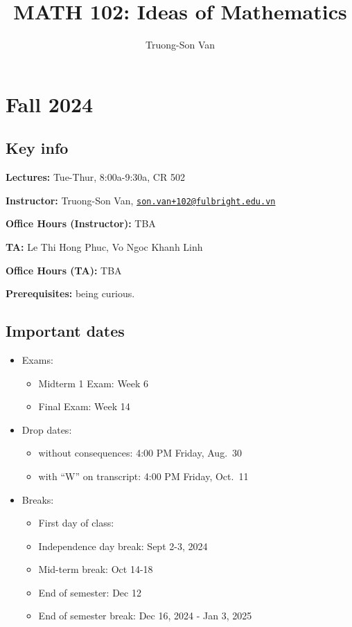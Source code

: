 \documentclass[
]{article}
\title{MATH 102: Ideas of Mathematics}
\author{Truong-Son Van}
\date{}
\providecommand{\tightlist}{%
  \setlength{\itemsep}{0pt}\setlength{\parskip}{0pt}}
\begin{document}
\maketitle

{
\setcounter{tocdepth}{2}
\tableofcontents
}
\section*{Fall 2024}\label{fall-2024}

\subsection*{Key info}\label{key-info}

\textbf{Lectures:} Tue-Thur, 8:00a-9:30a, CR 502

\textbf{Instructor:} Truong-Son Van, \href{mailto:son.van+102@fulbright.edu.vn}{\nolinkurl{son.van+102@fulbright.edu.vn}}

\textbf{Office Hours (Instructor):} TBA

\textbf{TA:} Le Thi Hong Phuc, Vo Ngoc Khanh Linh

\textbf{Office Hours (TA):}
TBA

\textbf{Prerequisites:} being curious.

\subsection*{Important dates}\label{important-dates}

\begin{itemize}
\tightlist
\item
  Exams:

  \begin{itemize}
  \tightlist
  \item
    Midterm 1 Exam: Week 6
  \item
    Final Exam: Week 14
  \end{itemize}
\item
  Drop dates:

  \begin{itemize}
  \tightlist
  \item
    without consequences: 4:00 PM Friday, Aug.~30
  \item
    with ``W'' on transcript: 4:00 PM Friday, Oct.~11
  \end{itemize}
\item
  Breaks:

  \begin{itemize}
  \tightlist
  \item
    First day of class:
  \item
    Independence day break: Sept 2-3, 2024
  \item
    Mid-term break: Oct 14-18
  \item
    End of semester: Dec 12
  \item
    End of semester break: Dec 16, 2024 - Jan 3, 2025
  \end{itemize}
\end{itemize}
\end{document}
